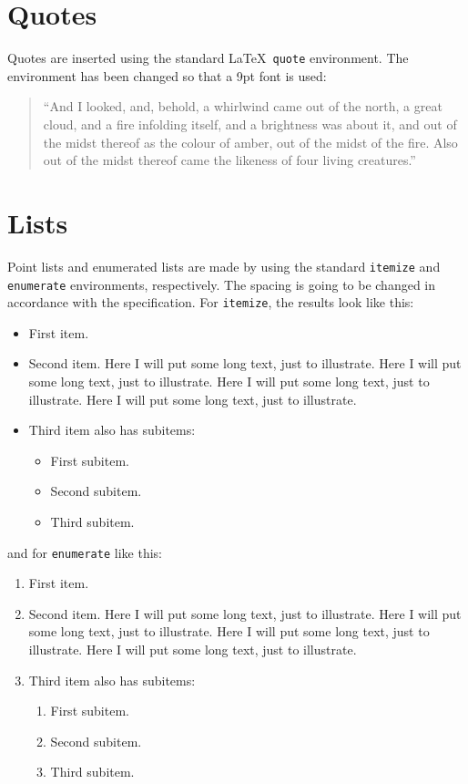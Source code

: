 \section{Quotes}
\label{sec:Quotes} %

Quotes are inserted using the standard \LaTeX\ \texttt{quote}
environment. The environment has been changed so that a 9pt font is
used:

\begin{quote}
  ``And I looked, and, behold, a whirlwind came out of the north, a
  great cloud, and a fire infolding itself, and a brightness was about
  it, and out of the midst thereof as the colour of amber, out of the
  midst of the fire. Also out of the midst thereof came the likeness
  of four living creatures.''
\end{quote}

\section{Lists}
\label{sec:lists}

Point lists and enumerated lists are made by using the standard
\texttt{itemize} and \texttt{enumerate} environments, respectively.
The spacing is going to be changed in accordance with the specification. For
\texttt{itemize}, the results look like this:
\begin{itemize}
	\item First item.
	\item Second item. Here I will put some long text, just to illustrate.
	  Here I will put some long text, just to illustrate. Here I will put
	  some long text, just to illustrate. Here I will put some long text,
	  just to illustrate.
	\item Third item also has subitems:
	  \begin{itemize}
		  \item First subitem.
		  \item Second subitem.
		  \item Third subitem.
	  \end{itemize}
\end{itemize}
and for \texttt{enumerate} like this:
\begin{enumerate}
	\item First item.
	\item Second item. Here I will put some long text, just to illustrate.
	  Here I will put some long text, just to illustrate. Here I will put
	  some long text, just to illustrate. Here I will put some long text,
	  just to illustrate.
	\item Third item also has subitems:
	  \begin{enumerate}
		  \item First subitem.
		  \item Second subitem.
		  \item Third subitem.
	  \end{enumerate}
\end{enumerate}

